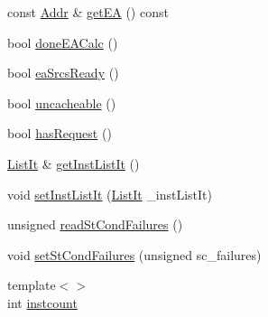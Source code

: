\begin{DoxyCompactItemize}
\item 
const \hyperlink{base_2types_8hh_af1bb03d6a4ee096394a6749f0a169232}{Addr} \& \hyperlink{classBaseDynInst_a6fd9d852d5780eb802b4d2520e58747b}{getEA} () const 
\item 
bool \hyperlink{classBaseDynInst_a2f1c9119ee950f8afc730ea9d6e92d84}{doneEACalc} ()
\item 
bool \hyperlink{classBaseDynInst_ae3a07556a5b5d8248cbfb1c99561340d}{eaSrcsReady} ()
\item 
bool \hyperlink{classBaseDynInst_a21fc1eb6d0621763c50b19a1c0d25ca1}{uncacheable} ()
\item 
bool \hyperlink{classBaseDynInst_ad04e6525dc209abe51106ce7fde57576}{hasRequest} ()
\item 
\hyperlink{classBaseDynInst_a184cb829e22cc656acb41864f68f51ea}{ListIt} \& \hyperlink{classBaseDynInst_a3dc054e66fce6c154e88f4c1ecc868d2}{getInstListIt} ()
\item 
void \hyperlink{classBaseDynInst_aeb6ae2640509c7f45f53c03d92f8f920}{setInstListIt} (\hyperlink{classBaseDynInst_a184cb829e22cc656acb41864f68f51ea}{ListIt} \_\-instListIt)
\item 
unsigned \hyperlink{classBaseDynInst_a25b995a791e41965e088d8bf3f2bf859}{readStCondFailures} ()
\item 
void \hyperlink{classBaseDynInst_abbe779fa43c72cd485ddb736ab17ff61}{setStCondFailures} (unsigned sc\_\-failures)
\item 
{\footnotesize template$<$$>$ }\\int \hyperlink{classBaseDynInst_a19e374b98940ff65bd4d9d17f198738c}{instcount}
\end{DoxyCompactItemize}
